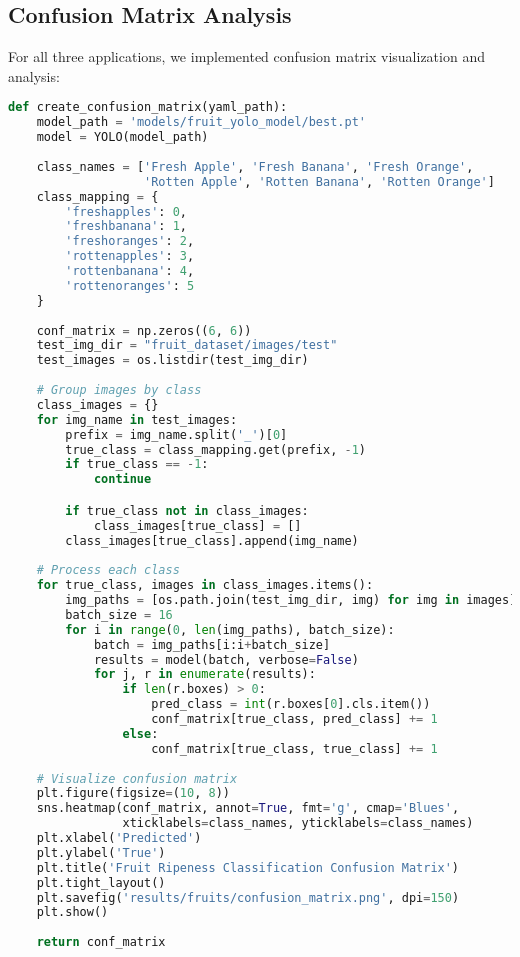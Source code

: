 \subsection{Confusion Matrix Analysis}
\label{appendix:confusion-matrix}

For all three applications, we implemented confusion matrix visualization and analysis:

\begin{lstlisting}[language=Python, caption={Confusion Matrix Generation for Model Analysis}, label={lst:confusion-matrix}]
def create_confusion_matrix(yaml_path):
    model_path = 'models/fruit_yolo_model/best.pt'
    model = YOLO(model_path)
    
    class_names = ['Fresh Apple', 'Fresh Banana', 'Fresh Orange',
                   'Rotten Apple', 'Rotten Banana', 'Rotten Orange']
    class_mapping = {
        'freshapples': 0,
        'freshbanana': 1,
        'freshoranges': 2,
        'rottenapples': 3,
        'rottenbanana': 4,
        'rottenoranges': 5
    }
    
    conf_matrix = np.zeros((6, 6))
    test_img_dir = "fruit_dataset/images/test"
    test_images = os.listdir(test_img_dir)
    
    # Group images by class
    class_images = {}
    for img_name in test_images:
        prefix = img_name.split('_')[0]
        true_class = class_mapping.get(prefix, -1)
        if true_class == -1:
            continue

        if true_class not in class_images:
            class_images[true_class] = []
        class_images[true_class].append(img_name)
    
    # Process each class
    for true_class, images in class_images.items():
        img_paths = [os.path.join(test_img_dir, img) for img in images]
        batch_size = 16
        for i in range(0, len(img_paths), batch_size):
            batch = img_paths[i:i+batch_size]
            results = model(batch, verbose=False)
            for j, r in enumerate(results):
                if len(r.boxes) > 0:
                    pred_class = int(r.boxes[0].cls.item())
                    conf_matrix[true_class, pred_class] += 1
                else:
                    conf_matrix[true_class, true_class] += 1
                    
    # Visualize confusion matrix
    plt.figure(figsize=(10, 8))
    sns.heatmap(conf_matrix, annot=True, fmt='g', cmap='Blues',
                xticklabels=class_names, yticklabels=class_names)
    plt.xlabel('Predicted')
    plt.ylabel('True')
    plt.title('Fruit Ripeness Classification Confusion Matrix')
    plt.tight_layout()
    plt.savefig('results/fruits/confusion_matrix.png', dpi=150)
    plt.show()
    
    return conf_matrix
\end{lstlisting}

